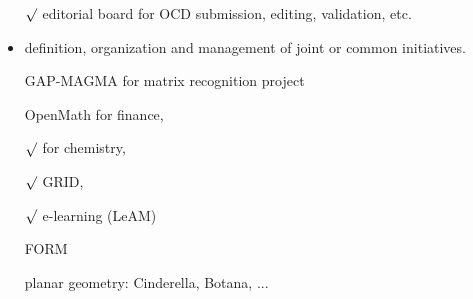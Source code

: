 \documentclass[draft]{artikel3}
\begin{document}
\begin{itemize}
$\surd$ editorial board for OCD submission, editing, validation, etc.

\item definition, organization and management of joint or common
  initiatives.

GAP-MAGMA for matrix recognition project

OpenMath for finance,

$\surd$ for chemistry, 

$\surd$ GRID, 

$\surd$ e-learning (LeAM) 

FORM

planar geometry: Cinderella, Botana, ...



\end{itemize}
\end{document}
